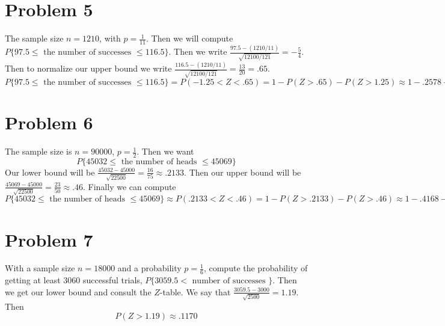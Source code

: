 \documentclass{article}
\begin{document}
\section*{Problem 5}
    The sample size $n = 1210$, with $p = \frac{1}{11}$. Then we will compute $P\{97.5 \leqslant \text{ the number of successes } \leqslant 116.5\}$.
    Then we write $\frac{97.5 - (1210 / 11)}{\sqrt{12100 / 121}} = -\frac{5}{4}$. Then to normalize our upper bound we write 
    $\frac{116.5 - (1210 / 11)}{\sqrt{12100 / 121}} = \frac{13}{20} = .65$.
    \[
        P\{97.5 \leqslant \text{ the number of successes } \leqslant 116.5\} = P(-1.25 < Z < .65) = 1 - P(Z > .65) - P(Z > 1.25) \approx 1 - .2578 - .1056 = .6366
    \]
\section*{Problem 6}
    The sample size is $n = 90000$, $p = \frac{1}{2}$. Then we want 
    \[
        P \{ 45032 \leqslant \text{ the number of heads } \leqslant 45069 \}
    \]
    Our lower bound will be $\frac{45032 - 45000}{\sqrt{22500}} = \frac{16}{75} \approx .2133$.
    Then our upper bound will be $\frac{45069 - 45000}{\sqrt{22500}} = \frac{23}{50} \approx .46$.
    Finally we can compute 
    \[
        P\{ 45032 \leqslant \text{ the number of heads } \leqslant 45069 \} \approx P(.2133 < Z < .46) = 1 - P(Z > .2133) - P(Z > .46) \approx 1 - .4168 - .3228 = .2604
    \]
\section*{Problem 7}
    With a sample size $n = 18000$ and a probability $p = \frac{1}{6}$, compute the probability of getting at least 
    3060 successful trials, $P\{3059.5 < \text{ number of successes }\}$. Then we get our lower bound and consult the $Z$-table.
    We say that $\frac{3059.5 - 3000}{\sqrt{2500}} = 1.19$. Then 
    \[
        P(Z > 1.19) \approx .1170
    \]
\end{document}
